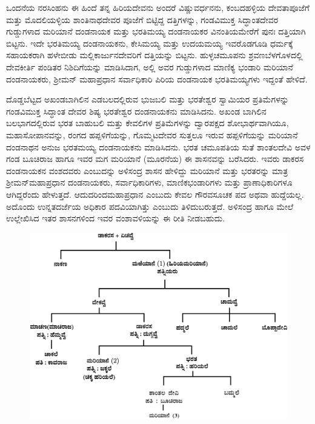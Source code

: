 \newpage

ಒಂದನೆಯ ನರಸಿಂಹನು ಈ ಹಿಂದೆ ತನ್ನ ಹಿರಿಯದೇವನು ಅಂದರೆ ವಿಷ್ಣುವರ್ಧನನು, ಕಂಬದಹಳ್ಳಿಯ ದೇವತಾ\-ಪೂಜೆಗೆ ಮತ್ತು ಮೊದಲಿಯಳ್ಳಿಯ ಶಾಂತಿನಾಥದೇವರ ಪೂಜೆಗೆ ಬಿಟ್ಟಿದ್ದ ದತ್ತಿಗಳನ್ನು, ಗಂಡವಿಮುಕ್ತ ಸಿದ್ಧಾಂತದೇವರ ಗುಡ್ಡುಗಳಾದ ಮರಿಯಾನೆ ದಂಡನಾಯಕ ಮತ್ತು ಭರತಿಮಯ್ಯ ದಂಡನಾಯಕರ ವಿನಂತಿಯಮೇರೆಗೆ ಪುನಃ ದತ್ತಿಯಾಗಿ ಬಿಟ್ಟನು. ಇದೇ ಭರತಿಮಯ್ಯ ದಂಡನಾಯಕನು, ಕೇಸಿಮಯ್ಯ ಮತ್ತು ಉದಯಮಯ್ಯ ಇವರೊಡಗೂಡಿ ಧರ್ಮಕ್ಕೆ ಸಹಾಯಕರಾಗಿ ಹಳೇಬೀಡು ಮಲ್ಲಿಕಾರ್ಜುನದೇವರಿಗೆ ದತ್ತಿಯನ್ನು ಬಿಟ್ಟನು. ಹುಳ್ಳಚಮೂಪನು ಶ್ರವಣಬೆಳಗೊಳದಲ್ಲಿ ದೇವಕೀರ್ತಿ ಪಂಡಿತರ ನಿಶಿದಿಗೆಯನ್ನು ಮಾಡಿಸಿದಾಗ, ಅಲ್ಲಿ ಅವರ ಗುಡ್ಡುಗಳಾದ ಮಾಣಿಕ್ಯ ಭಂಡಾರಿ ಮರಿಯಾನೆ ದಂಡನಾಯ\-ಕರು, ಶ‍್ರೀಮನ್​ ಮಹಾಪ್ರಧಾನ ಸರ್ವಾಧಿಕಾರಿ ಪಿರಿಯ ದಂಡನಾಯಕ ಭರತಿಮಯ್ಯಗಳು ಇದ್ದಂತೆ ಹೇಳಿದೆ.

ದೊಡ್ಡಬೆಟ್ಟದ ಅಖಂಡಬಾಗಿಲಿನ ಎಡಬಲದಲ್ಲಿರುವ ಭುಜಬಲಿ ಮತ್ತು ಭರತೇಶ್ವರ ಸ್ವಾಮಿಯರ ಪ್ರತಿಮೆಗಳನ್ನು ಗಂಡವಿಮುಕ್ತ ಸಿದ್ಧಾಂತ ದೇವರ ಶಿಷ್ಯ ಭರತೇಶ್ವರ ದಂಡನಾಯಕನು ಮಾಡಿಸಿದನು. ಅಖಂಡ ಬಾಗಿಲಿನ ಬಲಭಾಗದಲ್ಲಿರುವ ಭರತ ಬಾಹುಬಲಿ ಮತ್ತು ಕೇವಲಿಗಳ ಪ್ರತಿಮೆಗಳನ್ನು ದ್ವಾರಪಕ್ಷದ ಶೋಭಾರ್ಥವಾಗಿಯೂ, ಮಹಾಸೋಪಾನವನ್ನು, ರಂಗದ ಹಪ್ಪಳಿಗೆಯನ್ನು, ಗೊಮ್ಮಟದೇವರ ಸುತ್ತಲೂ ಇರುವ ಹಪ್ಪಳಿಗೆಯನ್ನು ಮರಿಯಾನೆ ದಂಡನಾಥನ ಅನುಜ ಭರತಮಯ್ಯ ದಂಡನಾಯಕನು ಮಾಡಿಸಿದನು. ಭರತ ಚಮೂಪತಿಯ ಸುತೆ ಶಾಂತಲದೇವಿ ಅವಳ ಗಂಡ ಬೂಚಿರಾಜ ಹಾಗೂ ಇವರ ಮಗ ಮರಿಯಾನೆ (ಮೂರನೆಯ) ಈ ಶಾಸನವನ್ನು ಬರೆಸಿದರು. ಇವರು ಡಾಕರಸ ದಂಡನಾಯಕನ ವಂಶದವರು ಎಂಬುದನ್ನು ಅಳಿಸಂದ್ರ ಶಾಸನ ಹೇಳಿದ್ದು ಮರಿಯಾನೆ ಮತ್ತು ಭರತರನ್ನು ಮಾತ್ರ ಶ‍್ರೀಮನ್​ ಮಹಾಪ್ರಧಾನ ದಂಡನಾಯಕರು, ಸರ್ವಾಧಿಕಾರಿಗಳು, ಮಾಣಿಕಭಂಡಾರಿಗಳು ಮತ್ತು ಪ್ರಾಣಾಧಿಕಾರಿಗಳೂ ಆಗಿದ್ದರೆಂದು ಹೇಳುತ್ತದೆ. ಆದುದರಿಂದ\break ಮಹಾಪ್ರಧಾನ ಎಂಬುದು ಕೇವಲ ಗೌರವಸೂಚಕ ಪದ ಅಥವಾ ಹುದ್ದೆಯಲ್ಲ. ಅದೊಂದು ಉನ್ನತದರ್ಜೆಯ ಅಧಿಕಾರ ಪದವಿಯಾಗಿತ್ತು ಎಂಬುದು ತಿಳಿದುಬರುತ್ತದೆ. ಅಳಿಸಂದ್ರ ಹಾಗೂ ಮೇಲೆ ಉಲ್ಲೇಖಿಸಿದ ಇತರ ಶಾಸನಗಳಿಂದ ಇವರ ವಂಶಾವಳಿಯನ್ನು ಈ ರೀತಿ ನೀಡಬಹುದು.

\begin{figure}[H]
\includegraphics[scale=1.15]{images/chap3/chap3fig13.jpeg}
\end{figure}

